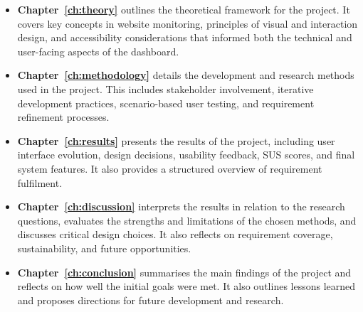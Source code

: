 \begin{itemize}
    \item \textbf{Chapter~\ref{ch:theory}} outlines the theoretical framework for the project. It covers key concepts in website monitoring, principles of visual and interaction design, and accessibility considerations that informed both the technical and user-facing aspects of the dashboard.
    
    \item \textbf{Chapter~\ref{ch:methodology}} details the development and research methods used in the project. This includes stakeholder involvement, iterative development practices, scenario-based user testing, and requirement refinement processes.
    
    \item \textbf{Chapter~\ref{ch:results}} presents the results of the project, including user interface evolution, design decisions, usability feedback, SUS scores, and final system features. It also provides a structured overview of requirement fulfilment.
    
    \item \textbf{Chapter~\ref{ch:discussion}} interprets the results in relation to the research questions, evaluates the strengths and limitations of the chosen methods, and discusses critical design choices. It also reflects on requirement coverage, sustainability, and future opportunities.
    
    \item \textbf{Chapter~\ref{ch:conclusion}} summarises the main findings of the project and reflects on how well the initial goals were met. It also outlines lessons learned and proposes directions for future development and research.
\end{itemize}






